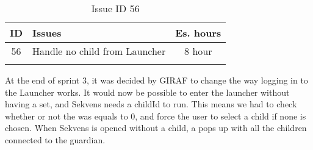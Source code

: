 \begin{longtable} { | c | p{12cm} | c | } 
\hline
	ID 	&	Issues	&		 Es. hours \\\hline
	56	&	Handle no child from Launcher	&	8 hour	\\\hline
\caption{Issue ID 56}
\label{tab:spr4_iconstobuttons}
\end{longtable}

At the end of sprint 3, it was decided by GIRAF to change the way logging in to the Launcher works. It would now be possible to enter the launcher without having a  set, and Sekvens needs a childId to run. This means we had to check whether or not the  was equals to 0, and force the user to select a child if none is chosen. When Sekvens is opened without a child, a  pops up with all the children connected to the guardian.